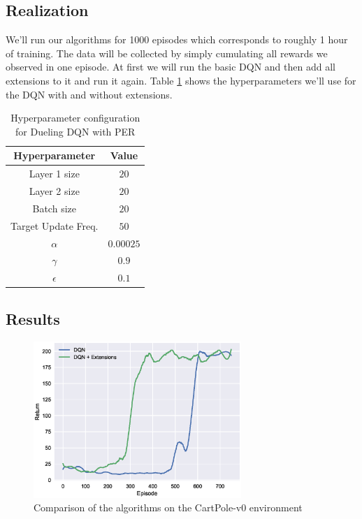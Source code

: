 \subsection{Realization}

We'll run our algorithms for 1000 episodes which corresponds to roughly 1 hour of training.
The data will be collected by simply cumulating all rewards we observed in one episode.
At first we will run the basic DQN and then add all extensions to it and run it again.
Table \ref{tb:dqn_params} shows the hyperparameters we'll use for the DQN with and without extensions.

\begin{table}[H]
  \centering
  \begin{tabular}{| c | c |}
      \hline
      Hyperparameter & Value\\ \hline
      Layer 1 size & $20$\\
      Layer 2 size & $20$\\
      Batch size & $20$\\
      Target Update Freq. & $50$\\
      $\alpha$ & $0.00025$\\
      $\gamma$ & $0.9$\\
      $\epsilon$ & $0.1$\\
      \hline
  \end{tabular}
\caption{Hyperparameter configuration for Dueling DQN with PER}
\label{tb:dqn_params}
\end{table}


\subsection{Results}

\begin{figure}[H]
\centerline{
\includegraphics[width=0.7\textwidth]{images/dqn_compare_cartpole.eps}}
\caption{Comparison of the algorithms on the CartPole-v0 environment}
\label{fig:cartpole_compare}
\end{figure}

